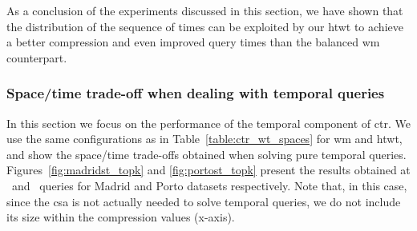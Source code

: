 

	As a conclusion of the experiments discussed in this section, we have shown that
	the distribution of the sequence of times can be
	exploited by our \gls{htwt} to achieve a better compression and even improved
	query times than the balanced \gls{wm} counterpart.


	\subsubsection{Space/time trade-off when dealing with temporal  queries}

	In this section we focus on the performance of the temporal component of \gls{ctr}. We use the same 
	configurations as in Table~\ref{table:ctr_wt_spaces} for \gls{wm} and \gls{htwt}, and 
	show the space/time trade-offs obtained when solving pure temporal queries. Figures~\ref{fig:madridst_topk}
	and \ref{fig:portost_topk} present the results obtained at  \Tut\ and \Tst\ queries for Madrid and Porto datasets respectively. 
	Note that, in this case, since the \gls{csa} is not actually needed to solve temporal queries, we do not include its size
	within the compression values (x-axis). 



